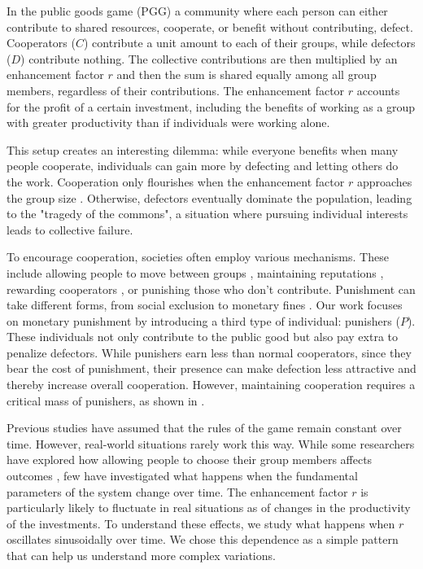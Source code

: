 In the public goods game (PGG) a community where each person can either contribute to shared resources, cooperate, or benefit without contributing, defect. Cooperators ($C$) contribute a unit amount to each of their groups, while defectors ($D$) contribute nothing. The collective contributions are then multiplied by an enhancement factor $r$ and then the sum is shared equally among all group members, regardless of their contributions. The enhancement factor $r$ accounts for the profit of a certain investment, including the benefits of working as a group with greater productivity than if individuals were working alone.

This setup creates an interesting dilemma: while everyone benefits when many people cooperate, individuals can gain more by defecting and letting others do the work. Cooperation only flourishes when the enhancement factor $r$ approaches the group size \cite{r/G}. Otherwise, defectors eventually dominate the population, leading to the "tragedy of the commons", a situation where pursuing individual interests leads to collective failure.


To encourage cooperation, societies often employ various mechanisms. These include allowing people to move between groups \cite{Migration}, maintaining reputations \cite{Reputation}, rewarding cooperators \cite{Reward}, or punishing those who don't contribute. Punishment can take different forms, from social exclusion \cite{SocialExclusion} to monetary fines \cite{Punish2}. Our work focuses on monetary punishment by introducing a third type of individual: punishers ($P$). These individuals not only contribute to the public good but also pay extra to penalize defectors. While punishers earn less than normal cooperators, since they bear the cost of punishment, their presence can make defection less attractive and thereby increase overall cooperation. However, maintaining cooperation requires a critical mass of punishers, as shown in \cite{SocialExclusion}.


Previous studies have assumed that the rules of the game remain constant over time. However, real-world situations rarely work this way. While some researchers have explored how allowing people to choose their group members affects outcomes \cite{EdgeRule}, few have investigated what happens when the fundamental parameters of the system change over time. The enhancement factor $r$ is particularly likely to fluctuate in real situations as of changes in the productivity of the investments. To understand these effects, we study what happens when $r$ oscillates sinusoidally over time. We chose this dependence as a simple pattern that can help us understand more complex variations.

